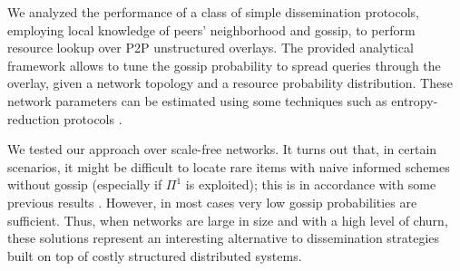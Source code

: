 \documentclass{sig-alternate}
\begin{document}
We analyzed the performance of a class of simple dissemination protocols, employing local knowledge of peers' neighborhood and gossip, to perform resource lookup over \ac{P2P} unstructured overlays. 
The provided analytical framework allows to tune the gossip probability to spread queries through the overlay, given a network topology and a resource probability distribution. These network parameters can be estimated using some techniques such as entropy-reduction protocols \cite{montresorMJB04}.

We tested our approach over scale-free networks.
It turns out that, in certain scenarios, it might be difficult to locate rare items with naive informed schemes without gossip (especially if $\Pi^1$ is exploited); this is in accordance with some previous results \cite{PuttaswamySZ08}. However, in most cases very low gossip probabilities are sufficient.
Thus, when networks are large in size and with a high level of churn, these solutions represent an interesting alternative to dissemination strategies built on top of costly structured distributed systems.
\end{document}
